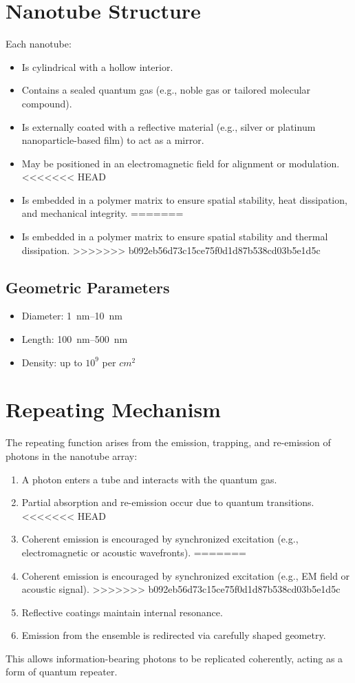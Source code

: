 \documentclass[11pt]{article}
\begin{document}
	\section{Nanotube Structure}
	Each nanotube:
	\begin{itemize}
		\item Is cylindrical with a hollow interior.
		\item Contains a sealed quantum gas (e.g., noble gas or tailored molecular compound).
		\item Is externally coated with a reflective material (e.g., silver or platinum nanoparticle-based film) to act as a mirror.
		\item May be positioned in an electromagnetic field for alignment or modulation.
<<<<<<< HEAD
		\item Is embedded in a polymer matrix to ensure spatial stability, heat dissipation, and mechanical integrity.
=======
		\item Is embedded in a polymer matrix to ensure spatial stability and thermal dissipation.
>>>>>>> b092eb56d73c15ce75f0d1d87b538cd03b5e1d5c
	\end{itemize}
	
	\subsection{Geometric Parameters}
	\begin{itemize}
		\item Diameter: \SIrange{1}{10}{\nano\meter}
		\item Length: \SIrange{100}{500}{\nano\meter}
		\item Density: up to $10^9$ per $\si{cm^2}$
	\end{itemize}
	
	\section{Repeating Mechanism}
	The repeating function arises from the emission, trapping, and re-emission of photons in the nanotube array:
	\begin{enumerate}
		\item A photon enters a tube and interacts with the quantum gas.
		\item Partial absorption and re-emission occur due to quantum transitions.
<<<<<<< HEAD
		\item Coherent emission is encouraged by synchronized excitation (e.g., electromagnetic or acoustic wavefronts).
=======
		\item Coherent emission is encouraged by synchronized excitation (e.g., EM field or acoustic signal).
>>>>>>> b092eb56d73c15ce75f0d1d87b538cd03b5e1d5c
		\item Reflective coatings maintain internal resonance.
		\item Emission from the ensemble is redirected via carefully shaped geometry.
	\end{enumerate}
	This allows information-bearing photons to be replicated coherently, acting as a form of quantum repeater.
	
\end{document}
